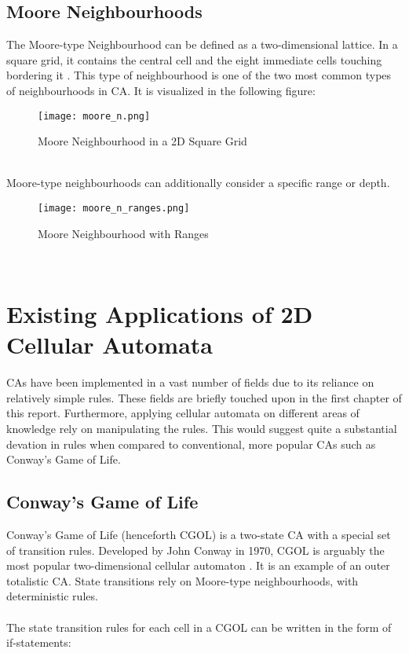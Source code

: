 \subsection{Moore Neighbourhoods} \label{moore_neighbourhoods}
The Moore-type Neighbourhood can be defined as a two-dimensional lattice. In a square grid, it contains the central cell and the eight immediate cells touching bordering it \cite{weisstein}. This type of neighbourhood is one of the two most common types of neighbourhoods in CA. It is visualized in the following figure:
\\
\begin{figure}[h]
    \caption{Moore Neighbourhood in a 2D Square Grid \cite{wolfram}}
    \centering
    \texttt{[image: moore\_n.png]}
\end{figure}
\\
Moore-type neighbourhoods can additionally consider a specific range or depth.
\begin{figure}[h]
    \caption{Moore Neighbourhood with Ranges \cite{wolfram}}
    \centering
    \texttt{[image: moore\_n\_ranges.png]}
\end{figure}
\\
\newpage
\section{Existing Applications of 2D Cellular Automata}
CAs have been implemented in a vast number of fields due to its reliance on relatively simple rules. These fields are briefly touched upon in the first chapter of this report. Furthermore, applying cellular automata on different areas of knowledge rely on manipulating the rules. This would suggest quite a substantial devation in rules when compared to conventional, more popular CAs such as Conway's Game of Life.

\subsection{Conway's Game of Life}
Conway's Game of Life (henceforth CGOL) is a two-state CA with a special set of transition rules. Developed by John Conway in 1970, CGOL is arguably the most popular two-dimensional cellular automaton \cite{gardner10fantastic}. It is an example of an outer totalistic CA. State transitions rely on Moore-type neighbourhoods, with deterministic rules. 
\\ \\
The state transition rules for each cell in a CGOL can be written in the form of if-statements:

